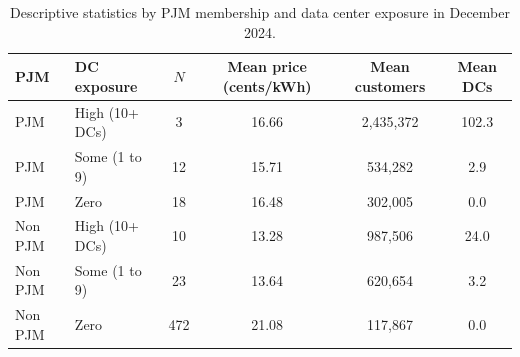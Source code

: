 \begin{table}[H]
\centering
\caption{Descriptive statistics by PJM membership and data center exposure in December 2024.}
\label{tab:descriptives}
\begin{tabular}{llcccc}
\toprule
PJM & DC exposure & $N$ & Mean price (cents/kWh) & Mean customers & Mean DCs \\
\midrule
PJM & High (10+ DCs) & 3 & 16.66 & 2,435,372 & 102.3 \\
PJM & Some (1 to 9) & 12 & 15.71 & 534,282 & 2.9 \\
PJM & Zero & 18 & 16.48 & 302,005 & 0.0 \\
Non PJM & High (10+ DCs) & 10 & 13.28 & 987,506 & 24.0 \\
Non PJM & Some (1 to 9) & 23 & 13.64 & 620,654 & 3.2 \\
Non PJM & Zero & 472 & 21.08 & 117,867 & 0.0 \\
\bottomrule
\end{tabular}
\end{table}
